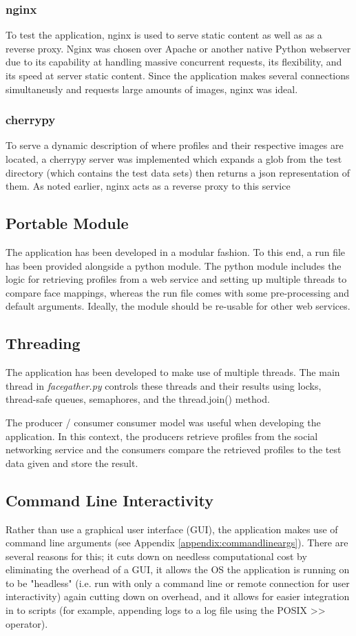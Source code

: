 \documentclass[12pt]{article}
\begin{document}
\subsubsection{nginx}
To test the application, nginx is used to serve static content as well as as a reverse proxy. Nginx was chosen over Apache or another native Python webserver due to its capability at handling massive concurrent requests, its flexibility, and its speed at server static content. Since the application makes several connections simultaneusly and requests large amounts of images, nginx was ideal.

\subsubsection{cherrypy}
To serve a dynamic description of where profiles and their respective images are located, a cherrypy server was implemented which expands a glob from the test directory (which contains the test data sets) then returns a json representation of them. As noted earlier, nginx acts as a reverse proxy to this service

\subsection{Portable Module}
The application has been developed in a modular fashion. To this end, a run file has been provided alongside a python module. The python module includes the logic for retrieving profiles from a web service and setting up multiple threads to compare face mappings, whereas the run file comes with some pre-processing and default arguments. Ideally, the module should be re-usable for other web services.

\subsection{Threading}
The application has been developed to make use of multiple threads. The main thread in \textit{facegather.py} controls these threads and their results using locks, thread-safe queues, semaphores, and the thread.join() method.

The producer / consumer consumer model was useful when developing the application. In this context, the producers retrieve profiles from the social networking service and the consumers compare the retrieved profiles to the test data given and store the result.

\subsection{Command Line Interactivity}
Rather than use a graphical user interface (GUI), the application makes use of command line arguments (see Appendix \ref{appendix:commandlineargs}). There are several reasons for this; it cuts down on needless computational cost by eliminating the overhead of a GUI, it allows the OS the application is running on to be "headless" (i.e. run with only a command line or remote connection for user interactivity) again cutting down on overhead, and it allows for easier integration in to scripts (for example, appending logs to a log file using the POSIX >> operator).
\end{document}
